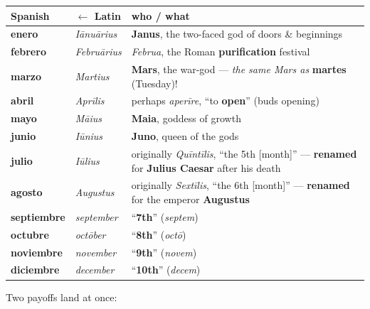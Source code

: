 \begin{cousinweb}
\noindent
\begin{tabularx}{\linewidth}{@{}>{\raggedright\arraybackslash}X>{\raggedright\arraybackslash}X>{\raggedright\arraybackslash}X@{}}
\toprule
\textbf{Spanish} & \textbf{$\leftarrow$ Latin} & \textbf{who / what} \\
\midrule
\textbf{enero} & \emph{Iānuārius} & \textbf{Janus}, the two-faced god of doors \& beginnings \\
\textbf{febrero} & \emph{Februārius} & \emph{Februa}, the Roman \textbf{purification} festival \\
\textbf{marzo} & \emph{Martius} & \textbf{Mars}, the war-god — \emph{the same Mars as} \textbf{martes} (Tuesday)! \\
\textbf{abril} & \emph{Aprīlis} & perhaps \emph{aperīre}, \textquotedblleft{}to \textbf{open}\textquotedblright{} (buds opening) \\
\textbf{mayo} & \emph{Māius} & \textbf{Maia}, goddess of growth \\
\textbf{junio} & \emph{Iūnius} & \textbf{Juno}, queen of the gods \\
\textbf{julio} & \emph{Iūlius} & originally \emph{Quīntīlis}, \textquotedblleft{}the 5th {[}month{]}\textquotedblright{} — \textbf{renamed} for \textbf{Julius Caesar} after his death \\
\textbf{agosto} & \emph{Augustus} & originally \emph{Sextīlis}, \textquotedblleft{}the 6th {[}month{]}\textquotedblright{} — \textbf{renamed} for the emperor \textbf{Augustus} \\
\textbf{septiembre} & \emph{september} & \textquotedblleft{}\textbf{7th}\textquotedblright{} (\emph{septem}) \\
\textbf{octubre} & \emph{octōber} & \textquotedblleft{}\textbf{8th}\textquotedblright{} (\emph{octō}) \\
\textbf{noviembre} & \emph{november} & \textquotedblleft{}\textbf{9th}\textquotedblright{} (\emph{novem}) \\
\textbf{diciembre} & \emph{december} & \textquotedblleft{}\textbf{10th}\textquotedblright{} (\emph{decem}) \\
\bottomrule
\end{tabularx}

Two payoffs land at once:


\end{cousinweb}

